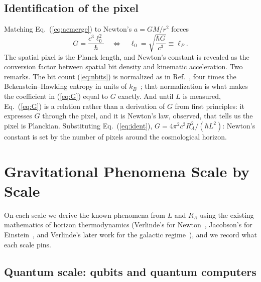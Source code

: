 \documentclass[aps,prd,twocolumn,superscriptaddress,nofootinbib,showkeys]{revtex4-2}
\begin{document}
\subsection{Identification of the pixel}
Matching Eq.~(\ref{eq:aemerge}) to Newton's $a = GM/r^2$ forces
\begin{equation}
G = \frac{c^3\ell_0^2}{\hbar}
\quad\Longleftrightarrow\quad
\ell_0 = \sqrt{\frac{\hbar G}{c^3}} \equiv \ell_P .
\label{eq:G}
\end{equation}
The spatial pixel is the Planck length, and Newton's constant is revealed as the conversion factor between spatial bit density and kinematic acceleration. Two remarks. The bit count (\ref{eq:nbits}) is normalized as in Ref.~\cite{verlinde2011}, four times the Bekenstein--Hawking entropy in units of $k_B$~\cite{bekenstein1973}; that normalization is what makes the coefficient in (\ref{eq:G}) equal to $G$ exactly. And until $L$ is measured, Eq.~(\ref{eq:G}) is a relation rather than a derivation of $G$ from first principles: it expresses $G$ through the pixel, and it is Newton's law, observed, that tells us the pixel is Planckian. Substituting Eq.~(\ref{eq:ident}), $G = 4\pi^2c^3R_\Lambda^2/(\hbar L^2)$: Newton's constant is set by the number of pixels around the cosmological horizon.

\section{Gravitational Phenomena Scale by Scale}
\label{sec:scales}

On each scale we derive the known phenomena from $L$ and $R_\Lambda$ using the existing mathematics of horizon thermodynamics (Verlinde's for Newton~\cite{verlinde2011}, Jacobson's for Einstein~\cite{jacobson1995}, and Verlinde's later work for the galactic regime~\cite{verlinde2017}), and we record what each scale pins.

\subsection{Quantum scale: qubits and quantum computers}
\end{document}
